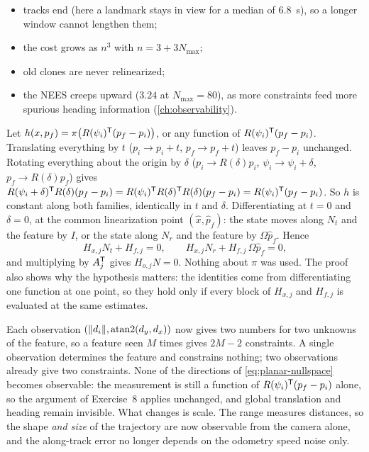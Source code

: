 \begin{solutions}
\begin{itemize}
                position, which no window removes;
          \item tracks end (here a landmark stays in view for a median of 6.8~s), so a longer window cannot lengthen them;
          \item the cost grows as $n^3$ with $n = 3 + 3N_{\max}$;
          \item old clones are never relinearized;
          \item the NEES creeps upward ($3.24$ at $N_{\max} = 80$), as more constraints feed more spurious heading information (\cref{ch:observability}).
        \end{itemize}

  \item Let $h(x, p_f) = \pi\big(R(\psi_i)^{\mathsf{T}}(p_f - p_i)\big)$, or any function of $R(\psi_i)^{\mathsf{T}}(p_f - p_i)$. Translating everything by $t$ ($p_i \to p_i + t$, $p_f \to p_f + t$) leaves $p_f - p_i$ unchanged.
        Rotating everything about the origin by $\delta$ ($p_i \to R(\delta)p_i$, $\psi_i \to \psi_i + \delta$, $p_f \to R(\delta)p_f$) gives
        $R(\psi_i + \delta)^{\mathsf{T}} R(\delta)(p_f - p_i) = R(\psi_i)^{\mathsf{T}} R(\delta)^{\mathsf{T}} R(\delta)(p_f - p_i) = R(\psi_i)^{\mathsf{T}}(p_f - p_i)$. So $h$ is constant along both families, identically in $t$ and $\delta$.
        Differentiating at $t = 0$ and $\delta = 0$, at the common linearization point $(\hat x, \hat p_f)$: the state moves along $N_t$ and the feature by $I$, or the state along $N_r$ and the
        feature by $\Omega\hat p_f$. Hence
        \[
          H_{x,j}N_t + H_{f,j} = 0, \qquad H_{x,j}N_r + H_{f,j}\,\Omega\hat p_f = 0,
        \]
        and multiplying by $A_j^{\mathsf{T}}$ gives $H_{o,j}N = 0$. Nothing about $\pi$ was used. The proof also shows why the hypothesis matters: the identities come from differentiating one
        function at one point, so they hold only if every block of $H_{x,j}$ and $H_{f,j}$ is evaluated at the same estimates.

  \item Each observation $(\|d_i\|, \operatorname{atan2}(d_y, d_x))$ now gives two numbers for two unknowns of the feature, so a feature seen $M$ times gives $2M - 2$ constraints. A single
        observation determines the feature and constrains nothing; two observations already give two constraints. None of the directions of
        \eqref{eq:planar-nullspace} becomes observable: the measurement is still a function of $R(\psi_i)^{\mathsf{T}}(p_f - p_i)$ alone, so the argument of Exercise~8 applies unchanged, and global
        translation and heading remain invisible. What changes is scale. The range measures distances, so the shape \emph{and size} of the trajectory are now
        observable from the camera alone, and the along-track error no longer depends on the odometry speed noise only.
\end{solutions}
